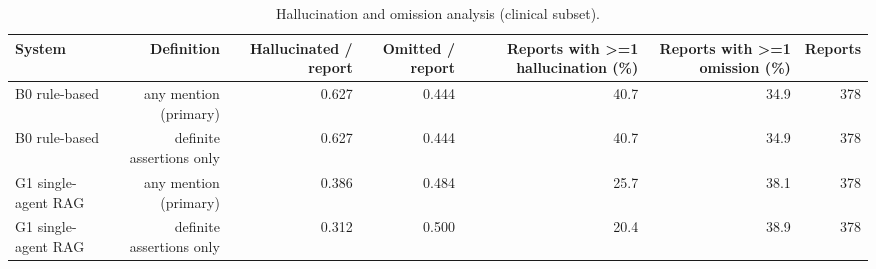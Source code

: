 \begin{table}[t]
\centering
\scriptsize
\begin{tabular}{lrrrrrr}
\hline
System & Definition & Hallucinated / report & Omitted / report & Reports with >=1 hallucination (\%) & Reports with >=1 omission (\%) & Reports \\
\hline
B0 rule-based & any mention (primary) & 0.627 & 0.444 & 40.7 & 34.9 & 378 \\
B0 rule-based & definite assertions only & 0.627 & 0.444 & 40.7 & 34.9 & 378 \\
G1 single-agent RAG & any mention (primary) & 0.386 & 0.484 & 25.7 & 38.1 & 378 \\
G1 single-agent RAG & definite assertions only & 0.312 & 0.500 & 20.4 & 38.9 & 378 \\
\hline
\end{tabular}
\caption{Hallucination and omission analysis (clinical subset).}
\label{tab:table4_hallucination_omission_analysis}
\end{table}

